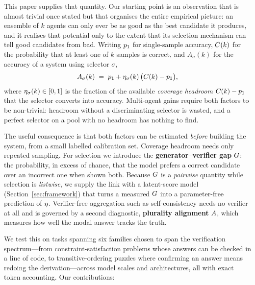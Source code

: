 This paper supplies that quantity. Our starting point is an observation that is
almost trivial once stated but that organises the entire empirical picture: an
ensemble of $k$ agents can only ever be as good as the best candidate it
produces, and it realises that potential only to the extent that its selection
mechanism can tell good candidates from bad. Writing $p_1$ for single-sample
accuracy, $C(k)$ for the probability that at least one of $k$ samples is
correct, and $A_\sigma(k)$ for the accuracy of a system using selector $\sigma$,
\begin{equation}
A_\sigma(k) \;=\; p_1 + \eta_\sigma(k)\,\bigl(C(k) - p_1\bigr),
\label{eq:decomp-intro}
\end{equation}
where $\eta_\sigma(k) \in [0,1]$ is the fraction of the available
\emph{coverage headroom} $C(k)-p_1$ that the selector converts into
accuracy. Multi-agent gains require both factors to be non-trivial: headroom
without a discriminating selector is wasted, and a perfect selector on a pool
with no headroom has nothing to find.

The useful consequence is that both factors can be estimated \emph{before}
building the system, from a small labelled calibration set. Coverage headroom
needs only repeated sampling. For selection we introduce the
\textbf{generator--verifier gap} $G$: the probability, in excess of chance,
that the model prefers a correct candidate over an incorrect one when shown
both. Because $G$ is a \emph{pairwise} quantity while selection is
\emph{listwise}, we supply the link with a latent-score model
(Section~\ref{sec:framework}) that turns a measured $G$ into a
parameter-free prediction of $\eta$. Verifier-free aggregation such as
self-consistency needs no verifier at all and is governed by a second
diagnostic, \textbf{plurality alignment} $A$, which measures how well the
modal answer tracks the truth.

We test this on \nTasks{} tasks spanning six families chosen to span the
verification spectrum---from constraint-satisfaction problems whose answers can
be checked in a line of code, to transitive-ordering puzzles where confirming
an answer means redoing the derivation---across \nModels{} model scales and
\nArch{} architectures, all with exact token accounting. Our contributions:


